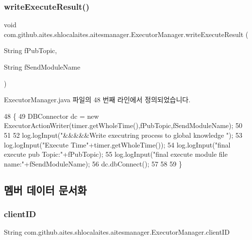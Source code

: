 \subsubsection{\texorpdfstring{write\+Execute\+Result()}{writeExecuteResult()}}
{\footnotesize\ttfamily void com.\+github.\+aites.\+shlocalaites.\+aitesmanager.\+Executor\+Manager.\+write\+Execute\+Result (\begin{DoxyParamCaption}\item[{String}]{f\+Pub\+Topic,  }\item[{String}]{f\+Send\+Module\+Name }\end{DoxyParamCaption})}



Executor\+Manager.\+java 파일의 48 번째 라인에서 정의되었습니다.


\begin{DoxyCode}
48                                                                             \{
49         DBConnector dc = \textcolor{keyword}{new} ExecutorActionWriter(timer.getWholeTime(),fPubTopic,fSendModuleName);
50         
51         
52         log.logInput(\textcolor{stringliteral}{"&&&&&Write executring process to global knowledge "});
53         log.logInput(\textcolor{stringliteral}{"Execute Time"}+timer.getWholeTime());
54         log.logInput(\textcolor{stringliteral}{"final execute pub Topic:"}+fPubTopic);
55         log.logInput(\textcolor{stringliteral}{"final execute module file name:"}+fSendModuleName);
56         dc.dbConnect();
57         
58         
59     \}
\end{DoxyCode}


\subsection{멤버 데이터 문서화}
\mbox{\label{classcom_1_1github_1_1aites_1_1shlocalaites_1_1aitesmanager_1_1_executor_manager_a13e89e7736ea367f5c0d986e92b417c9}} 
\subsubsection{\texorpdfstring{client\+ID}{clientID}}
{\footnotesize\ttfamily String com.\+github.\+aites.\+shlocalaites.\+aitesmanager.\+Executor\+Manager.\+client\+ID\hspace{0.3cm}{\ttfamily [private]}}



